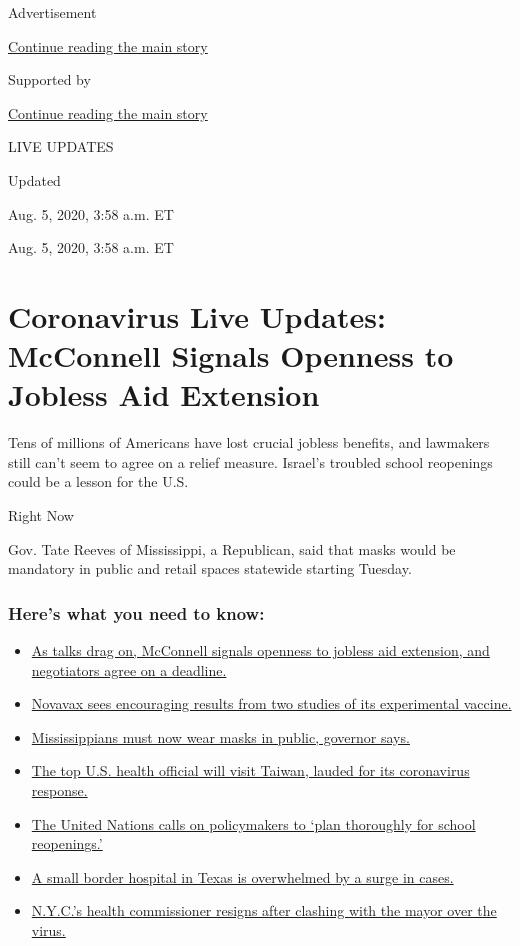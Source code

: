 Advertisement

\protect\hyperlink{after-top}{Continue reading the main story}

Supported by

\protect\hyperlink{after-sponsor}{Continue reading the main story}

LIVE UPDATES

Updated~

Aug. 5, 2020, 3:58 a.m. ET

Aug. 5, 2020, 3:58 a.m. ET

\hypertarget{coronavirus-live-updates-mcconnell-signals-openness-to-jobless-aid-extension}{%
\section{Coronavirus Live Updates: McConnell Signals Openness to Jobless
Aid
Extension}\label{coronavirus-live-updates-mcconnell-signals-openness-to-jobless-aid-extension}}

Tens of millions of Americans have lost crucial jobless benefits, and
lawmakers still can't seem to agree on a relief measure. Israel's
troubled school reopenings could be a lesson for the U.S.

Right Now

Gov. Tate Reeves of Mississippi, a Republican, said that masks would be
mandatory in public and retail spaces statewide starting Tuesday.

\hypertarget{heres-what-you-need-to-know}{%
\subsubsection{Here's what you need to
know:}\label{heres-what-you-need-to-know}}

\begin{itemize}
\tightlist
\item
  \protect\hyperlink{link-762df92}{As talks drag on, McConnell signals
  openness to jobless aid extension, and negotiators agree on a
  deadline.}
\item
  \protect\hyperlink{link-1228a480}{Novavax sees encouraging results
  from two studies of its experimental vaccine.}
\item
  \protect\hyperlink{link-794484ed}{Mississippians must now wear masks
  in public, governor says.}
\item
  \protect\hyperlink{link-30928a04}{The top U.S. health official will
  visit Taiwan, lauded for its coronavirus response.}
\item
  \protect\hyperlink{link-50f7386d}{The United Nations calls on
  policymakers to `plan thoroughly for school reopenings.'}
\item
  \protect\hyperlink{link-567c6115}{A small border hospital in Texas is
  overwhelmed by a surge in cases.}
\item
  \protect\hyperlink{link-4d1eafa8}{N.Y.C.'s health commissioner resigns
  after clashing with the mayor over the virus.}
\end{itemize}

